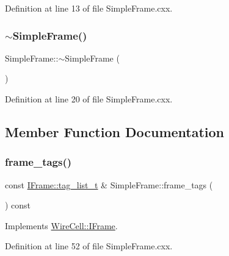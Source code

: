 Definition at line 13 of file Simple\+Frame.\+cxx.

\mbox{\label{class_wire_cell_1_1_simple_frame_ad40f9232148c703316df79058cf9ea24}} 
\subsubsection{\texorpdfstring{$\sim$\+Simple\+Frame()}{~SimpleFrame()}}
{\footnotesize\ttfamily Simple\+Frame\+::$\sim$\+Simple\+Frame (\begin{DoxyParamCaption}{ }\end{DoxyParamCaption})}



Definition at line 20 of file Simple\+Frame.\+cxx.



\subsection{Member Function Documentation}
\mbox{\label{class_wire_cell_1_1_simple_frame_ac52a4eab51683ef1b5bf746da3dcaec5}} 
\subsubsection{\texorpdfstring{frame\+\_\+tags()}{frame\_tags()}}
{\footnotesize\ttfamily const \hyperlink{class_wire_cell_1_1_i_frame_ab34485d40e352997c21b9ec99504ba7c}{I\+Frame\+::tag\+\_\+list\+\_\+t} \& Simple\+Frame\+::frame\+\_\+tags (\begin{DoxyParamCaption}{ }\end{DoxyParamCaption}) const\hspace{0.3cm}{\ttfamily [virtual]}}



Implements \hyperlink{class_wire_cell_1_1_i_frame_a4de75840db5d079b285e29c0e7f081e5}{Wire\+Cell\+::\+I\+Frame}.



Definition at line 52 of file Simple\+Frame.\+cxx.

